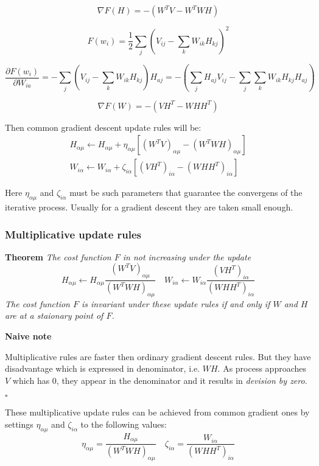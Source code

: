 \documentclass{extreport}
\begin{document}
\[
  \nabla F(H) = - ( W^TV - W^TWH )
\]

\[
  F(w_i) = \frac{1}{2}\sum_j
    \left( V_{ij} - \sum_k W_{ik}H_{kj} \right)^2
\]

\[
  \frac{\partial F(w_i)}{\partial W_{ia}} =
  - \sum_j
    \left(
      V_{ij} - \sum_k W_{ik}H_{kj}
    \right)
  H_{aj} =
  -
    \left(
      \sum_j H_{aj}V_{ij} - \sum_j \sum_k W_{ik}H_{kj}H_{aj}
    \right)
\]

\[
  \nabla F(W) = - ( VH^T - WHH^T )
\]

Then common gradient descent update rules will be:
\begin{align*}
  H_{\alpha\mu} \leftarrow H_{\alpha\mu} +
  \eta_{\alpha\mu} \left[
     (W^TV)_{\alpha\mu} - (W^TWH)_{\alpha\mu}
  \right] \\
  W_{i\alpha} \leftarrow W_{i\alpha} +
  \zeta_{i\alpha} \left[
    (VH^T)_{i\alpha} - (WHH^T)_{i\alpha}
  \right]
\end{align*}

Here $\eta_{\alpha\mu}$ and $\zeta_{i\alpha}$ must be such parameters
that guarantee the convergens of the iterative process.
Usually for a gradient descent they are taken small enough.

\subsubsection{Multiplicative update rules}

\textbf{Theorem} \textit{ The cost function $F$ in not increasing under
the update
\[
  H_{\alpha\mu} \leftarrow H_{\alpha\mu}
  \frac{(W^TV)_{\alpha\mu}}{(W^TWH)_{\alpha\mu}} \quad
  W_{i\alpha} \leftarrow W_{i\alpha}
  \frac{(VH^T)_{i\alpha}}{(WHH^T)_{i\alpha}}
\]
The cost function $F$ is invariant under these update rules if and only if
$W$ and $H$ are at a staionary point of $F$.
}

\textbf{Naive note}

Multiplicative rules are faster
then ordinary gradient descent rules.
But they have disadvantage which is expressed
in denominator, i.e. $WH$. As process approaches
$V$ which has 0, they appear in the denominator
and it results in {\it devision by zero}.

$\square$

These multiplicative update rules can be achieved from common gradient
ones by settings $\eta_{\alpha\mu}$ and $\zeta_{i\alpha}$ to
the following values:
\[
  \eta_{\alpha\mu} =
  \frac {H_{\alpha\mu}}
        {(W^TWH)_{\alpha\mu}} \quad
  \zeta_{i\alpha} =
  \frac {W_{i\alpha}}
        {(WHH^T)_{i\alpha}}
\]
\end{document}
